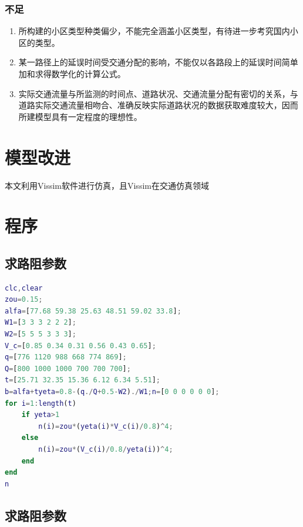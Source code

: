 \documentclass[fontset=fandol,a4paper,12pt]{ctexart}
\begin{document}
	  \subsubsection{不足}
		  \begin{enumerate}
			  \item 所构建的小区类型种类偏少，不能完全涵盖小区类型，有待进一步考究国内小区的类型。
			  \item 某一路径上的延误时间受交通分配的影响，不能仅以各路段上的延误时间简单加和求得数学化的计算公式。
			  \item 实际交通流量与所监测的时间点、道路状况、交通流量分配有密切的关系，与道路实际交通流量相吻合、准确反映实际道路状况的数据获取难度较大，因而所建模型具有一定程度的理想性。
		  \end{enumerate}
	\section{模型改进}
		本文利用Vissim软件进行仿真，且Vissim在交通仿真领域
  \newpage
  
  
  \newpage
  \appendix

  \section{程序}
  \subsection{求路阻参数}
  \begin{lstlisting}[language=MATLAB] 
clc,clear
zou=0.15;
alfa=[77.68 59.38 25.63 48.51 59.02 33.8];
W1=[3 3 3 2 2 2];
W2=[5 5 5 3 3 3];
V_c=[0.85 0.34 0.31 0.56 0.43 0.65];
q=[776 1120 988 668 774 869];
Q=[800 1000 1000 700 700 700];
t=[25.71 32.35 15.36 6.12 6.34 5.51];
b=alfa+tyeta=0.8-(q./Q+0.5-W2)./W1;n=[0 0 0 0 0 0];
for i=1:length(t)
	if yeta>1
		n(i)=zou*(yeta(i)*V_c(i)/0.8)^4;
	else
		n(i)=zou*(V_c(i)/0.8/yeta(i))^4;
	end
end
n
  \end{lstlisting}
  \subsection{求路阻参数}
  \begin{lstlisting}[language=MATLAB]
  
  \end{lstlisting}
\end{document}
